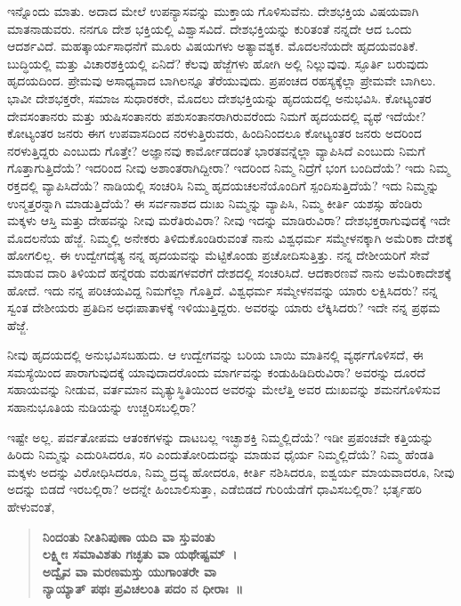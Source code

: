 \vskip   4pt

ಇನ್ನೊಂದು ಮಾತು. ಅದಾದ ಮೇಲೆ ಉಪನ್ಯಾಸವನ್ನು ಮುಕ್ತಾಯ ಗೊಳಿಸುವೆನು. ದೇಶಭಕ್ತಿಯ ವಿಷಯವಾಗಿ ಮಾತನಾಡುವರು. ನನಗೂ ದೇಶ ಭಕ್ತಿಯಲ್ಲಿ ವಿಶ್ವಾಸವಿದೆ. ದೇಶಭಕ್ತಿಯನ್ನು ಕುರಿತಂತೆ ನನ್ನದೇ ಆದ ಒಂದು ಆದರ್ಶವಿದೆ. ಮಹತ್ಕಾರ್ಯಸಾಧನೆಗೆ ಮೂರು ವಿಷಯಗಳು ಅತ್ಯಾವಶ್ಯಕ. ಮೊದಲನೆಯದೇ ಹೃದಯವಂತಿಕೆ. ಬುದ್ಧಿಯಲ್ಲಿ ಮತ್ತು ವಿಚಾರಶಕ್ತಿಯಲ್ಲಿ ಏನಿದೆ? ಕೆಲವು ಹೆಜ್ಜೆಗಳು ಹೋಗಿ ಅಲ್ಲಿ ನಿಲ್ಲುವುವು. ಸ್ಫೂರ್ತಿ ಬರುವುದು ಹೃದಯದಿಂದ. ಪ್ರೇಮವು ಅಸಾಧ್ಯವಾದ ಬಾಗಿಲನ್ನೂ ತೆರೆಯುವುದು. ಪ್ರಪಂಚದ ರಹಸ್ಯಕ್ಕೆಲ್ಲಾ ಪ್ರೇಮವೇ ಬಾಗಿಲು. ಭಾವೀ ದೇಶಭಕ್ತರೇ, ಸಮಾಜ ಸುಧಾರಕರೇ, ಮೊದಲು ದೇಶಭಕ್ತಿಯನ್ನು ಹೃದಯದಲ್ಲಿ ಅನುಭವಿಸಿ. ಕೋಟ್ಯಂತರ ದೇವಸಂತಾನರು ಮತ್ತು ಋಷಿಸಂತಾನರು ಪಶುಸಂತಾನರಾಗಿರುವರೆಂದು ನಿಮಗೆ ಹೃದಯದಲ್ಲಿ ವ್ಯಥೆ ಇದೆಯೇ? ಕೋಟ್ಯಂತರ ಜನರು ಈಗ ಉಪವಾಸದಿಂದ ನರಳುತ್ತಿರುವರು, ಹಿಂದಿನಿಂದಲೂ ಕೋಟ್ಯಂತರ ಜನರು ಅದರಿಂದ ನರಳುತ್ತಿದ್ದರು ಎಂಬುದು ಗೊತ್ತೇ? ಅಜ್ಞಾನವು ಕಾರ್ಮೋಡದಂತೆ ಭಾರತವನ್ನೆಲ್ಲಾ ವ್ಯಾಪಿಸಿದೆ ಎಂಬುದು ನಿಮಗೆ ಗೊತ್ತಾಗುತ್ತಿದೆಯೆ? ಇದರಿಂದ ನೀವು ಅಶಾಂತರಾಗಿದ್ದೀರಾ? ಇದರಿಂದ ನಿಮ್ಮ ನಿದ್ರೆಗೆ ಭಂಗ ಬಂದಿದೆಯೆ? ಇದು ನಿಮ್ಮ ರಕ್ತದಲ್ಲಿ ವ್ಯಾಪಿಸಿದೆಯೆ? ನಾಡಿಯಲ್ಲಿ ಸಂಚರಿಸಿ ನಿಮ್ಮ ಹೃದಯಚಲನೆಯೊಂದಿಗೆ ಸ್ಪಂದಿಸುತ್ತಿದೆಯೆ? ಇದು ನಿಮ್ಮನ್ನು ಉನ್ಮತ್ತರನ್ನಾಗಿ ಮಾಡುತ್ತಿದೆಯೆ? ಈ ಸರ್ವನಾಶದ ದುಃಖ ನಿಮ್ಮನ್ನು ವ್ಯಾಪಿಸಿ, ನಿಮ್ಮ ಕೀರ್ತಿ ಯಶಸ್ಸು ಹೆಂಡಿರು ಮಕ್ಕಳು ಆಸ್ತಿ ಮತ್ತು ದೇಹವನ್ನು ನೀವು ಮರೆತಿರುವಿರಾ? ನೀವು ಇದನ್ನು ಮಾಡಿರುವಿರಾ? ದೇಶಭಕ್ತರಾಗುವುದಕ್ಕೆ ಇದೇ ಮೊದಲನೆಯ ಹೆಜ್ಜೆ. ನಿಮ್ಮಲ್ಲಿ ಅನೇಕರು ತಿಳಿದುಕೊಂಡಿರುವಂತೆ ನಾನು ವಿಶ್ವಧರ್ಮ ಸಮ್ಮೇಳನಕ್ಕಾಗಿ ಅಮೆರಿಕಾ ದೇಶಕ್ಕೆ ಹೋಗಲಿಲ್ಲ. ಈ ಉದ್ವೇಗದೈತ್ಯ ನನ್ನ ಹೃದಯವನ್ನು ಮೆಟ್ಟಿಕೊಂಡು ಪ್ರಚೋದಿಸುತ್ತಿತ್ತು. ನನ್ನ ದೇಶೀಯರಿಗೆ ಸೇವೆ ಮಾಡುವ ದಾರಿ ತಿಳಿಯದೆ ಹನ್ನೆರಡು ವರುಷಗಳವರೆಗೆ ದೇಶದಲ್ಲಿ ಸಂಚರಿಸಿದೆ. ಆದಕಾರಣವೆ ನಾನು ಅಮೆರಿಕಾದೇಶಕ್ಕೆ ಹೋದೆ. ಇದು ನನ್ನ ಪರಿಚಯವಿದ್ದ ನಿಮಗೆಲ್ಲಾ ಗೊತ್ತಿದೆ. ವಿಶ್ವಧರ್ಮ ಸಮ್ಮೇಳನವನ್ನು ಯಾರು ಲಕ್ಷಿಸಿದರು? ನನ್ನ ಸ್ವಂತ ದೇಶೀಯರು ಪ್ರತಿದಿನ ಅಧಃಪಾತಾಳಕ್ಕೆ ಇಳಿಯುತ್ತಿದ್ದರು. ಅವರನ್ನು ಯಾರು ಲೆಕ್ಕಿಸಿದರು? ಇದೇ ನನ್ನ ಪ್ರಥಮ ಹೆಜ್ಜೆ.

\vskip   4pt

ನೀವು ಹೃದಯದಲ್ಲಿ ಅನುಭವಿಸಬಹುದು. ಆ ಉದ್ವೇಗವನ್ನು ಬರಿಯ ಬಾಯಿ ಮಾತಿನಲ್ಲಿ ವ್ಯರ್ಥಗೊಳಿಸದೆ, ಈ ಸಮಸ್ಯೆಯಿಂದ ಪಾರಾಗುವುದಕ್ಕೆ ಯಾವುದಾದರೊಂದು ಮಾರ್ಗವನ್ನು ಕಂಡುಹಿಡಿದಿರುವಿರಾ? ಅವರನ್ನು ದೂರದೆ ಸಹಾಯವನ್ನು ನೀಡುವ, ವರ್ತಮಾನ ಮೃತ್ಯುಸ್ಥಿತಿಯಿಂದ ಅವರನ್ನು ಮೇಲೆತ್ತಿ ಅವರ ದುಃಖವನ್ನು ಶಮನಗೊಳಿಸುವ ಸಹಾನುಭೂತಿಯ ನುಡಿಯನ್ನು ಉಚ್ಚರಿಸಬಲ್ಲಿರಾ?

\vskip   4pt

ಇಷ್ಟೇ ಅಲ್ಲ. ಪರ್ವತೋಪಮ ಆತಂಕಗಳನ್ನು ದಾಟಬಲ್ಲ ಇಚ್ಛಾಶಕ್ತಿ ನಿಮ್ಮಲ್ಲಿದೆಯೆ? ಇಡೀ ಪ್ರಪಂಚವೇ ಕತ್ತಿಯನ್ನು ಹಿರಿದು ನಿಮ್ಮನ್ನು ಎದುರಿಸಿದರೂ, ಸರಿ ಎಂದು\break ತೋರಿದುದನ್ನು ಮಾಡುವ ಧೈರ್ಯ ನಿಮ್ಮಲ್ಲಿದೆಯೆ? ನಿಮ್ಮ ಹೆಂಡತಿ ಮಕ್ಕಳು ಅದನ್ನು ವಿರೋಧಿಸಿದರೂ, ನಿಮ್ಮ ದ್ರವ್ಯ ಹೋದರೂ, ಕೀರ್ತಿ ನಶಿಸಿದರೂ, ಐಶ್ವರ್ಯ ಮಾಯವಾದರೂ, ನೀವು ಅದನ್ನು ಬಿಡದೆ ಇರಬಲ್ಲಿರಾ? ಅದನ್ನೇ ಹಿಂಬಾಲಿಸುತ್ತಾ, ಎಡೆಬಿಡದೆ ಗುರಿಯೆಡೆಗೆ ಧಾವಿಸಬಲ್ಲಿರಾ? ಭರ್ತೃಹರಿ ಹೇಳುವಂತೆ,

\begin{verse}
\textbf{ನಿಂದಂತು ನೀತಿನಿಪುಣಾ ಯದಿ ವಾ ಸ್ತುವಂತು}\\\textbf{ಲಕ್ಷ್ಮೀಃ ಸಮಾವಿಶತು ಗಚ್ಛತು ವಾ ಯಥೇಷ್ಟಮ್​~।}\\\textbf{ಅದ್ವೈವ ವಾ ಮರಣಮಸ್ತು ಯುಗಾಂತರೇ ವಾ}\\\textbf{ನ್ಯಾಯ್ಯಾತ್​ ಪಥಃ ಪ್ರವಿಚಲಂತಿ ಪದಂ ನ ಧೀರಾಃ~॥}
\end{verse}

